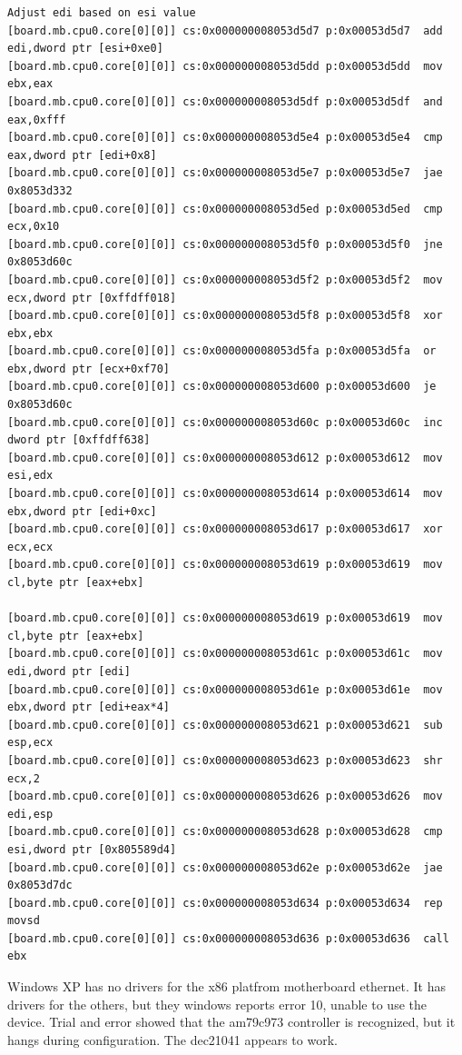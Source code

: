 \documentclass[titlepage]{article}
\begin{document}
\begin{appendices}
\begin{verbatim}
Adjust edi based on esi value
[board.mb.cpu0.core[0][0]] cs:0x000000008053d5d7 p:0x00053d5d7  add edi,dword ptr [esi+0xe0]
[board.mb.cpu0.core[0][0]] cs:0x000000008053d5dd p:0x00053d5dd  mov ebx,eax
[board.mb.cpu0.core[0][0]] cs:0x000000008053d5df p:0x00053d5df  and eax,0xfff
[board.mb.cpu0.core[0][0]] cs:0x000000008053d5e4 p:0x00053d5e4  cmp eax,dword ptr [edi+0x8]
[board.mb.cpu0.core[0][0]] cs:0x000000008053d5e7 p:0x00053d5e7  jae 0x8053d332
[board.mb.cpu0.core[0][0]] cs:0x000000008053d5ed p:0x00053d5ed  cmp ecx,0x10
[board.mb.cpu0.core[0][0]] cs:0x000000008053d5f0 p:0x00053d5f0  jne 0x8053d60c
[board.mb.cpu0.core[0][0]] cs:0x000000008053d5f2 p:0x00053d5f2  mov ecx,dword ptr [0xffdff018]
[board.mb.cpu0.core[0][0]] cs:0x000000008053d5f8 p:0x00053d5f8  xor ebx,ebx
[board.mb.cpu0.core[0][0]] cs:0x000000008053d5fa p:0x00053d5fa  or ebx,dword ptr [ecx+0xf70]
[board.mb.cpu0.core[0][0]] cs:0x000000008053d600 p:0x00053d600  je 0x8053d60c
[board.mb.cpu0.core[0][0]] cs:0x000000008053d60c p:0x00053d60c  inc dword ptr [0xffdff638]
[board.mb.cpu0.core[0][0]] cs:0x000000008053d612 p:0x00053d612  mov esi,edx
[board.mb.cpu0.core[0][0]] cs:0x000000008053d614 p:0x00053d614  mov ebx,dword ptr [edi+0xc]
[board.mb.cpu0.core[0][0]] cs:0x000000008053d617 p:0x00053d617  xor ecx,ecx
[board.mb.cpu0.core[0][0]] cs:0x000000008053d619 p:0x00053d619  mov cl,byte ptr [eax+ebx]

[board.mb.cpu0.core[0][0]] cs:0x000000008053d619 p:0x00053d619  mov cl,byte ptr [eax+ebx]
[board.mb.cpu0.core[0][0]] cs:0x000000008053d61c p:0x00053d61c  mov edi,dword ptr [edi]
[board.mb.cpu0.core[0][0]] cs:0x000000008053d61e p:0x00053d61e  mov ebx,dword ptr [edi+eax*4]
[board.mb.cpu0.core[0][0]] cs:0x000000008053d621 p:0x00053d621  sub esp,ecx
[board.mb.cpu0.core[0][0]] cs:0x000000008053d623 p:0x00053d623  shr ecx,2
[board.mb.cpu0.core[0][0]] cs:0x000000008053d626 p:0x00053d626  mov edi,esp
[board.mb.cpu0.core[0][0]] cs:0x000000008053d628 p:0x00053d628  cmp esi,dword ptr [0x805589d4]
[board.mb.cpu0.core[0][0]] cs:0x000000008053d62e p:0x00053d62e  jae 0x8053d7dc
[board.mb.cpu0.core[0][0]] cs:0x000000008053d634 p:0x00053d634  rep movsd 
[board.mb.cpu0.core[0][0]] cs:0x000000008053d636 p:0x00053d636  call ebx

\end{verbatim}

Windows XP has no drivers for the x86 platfrom motherboard ethernet.  It has drivers
for the others, but they windows reports error 10, unable to use the device.
Trial and error showed that the am79c973 controller is recognized, but it hangs during configuration.
The dec21041 appears to work.


\end{appendices}
\end{document}
